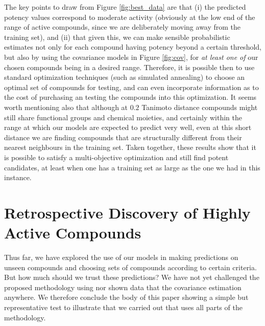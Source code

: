 \documentclass[journal=jacsat,manuscript=article]{achemso}
\begin{document}
\newline
\newline
The key points to draw from Figure \ref{fig:best_data} are that (i) the predicted potency values correspond to moderate activity (obviously at the low end of the range of active compounds, since we are deliberately moving away from the training set), and (ii) that given this, we can make sensible probabilistic estimates not only for each compound having potency beyond a certain threshold, but also by using the covariance models in Figure \ref{fig:cov}, for \textit{at least one of} our chosen compounds being in a desired range.   
Therefore, it is possible then to use standard optimization techniques (such as simulated annealing) to choose an optimal set of compounds for testing, and can even incorporate information as to the cost of purchasing an testing the compounds into this optimization. It seems worth mentioning also that although at $0.2$ Tanimoto distance compounds might still share functional groups and chemical moieties, and certainly within the range at which our models are expected to predict very well, even at this short distance we are finding compounds that are structurally different from their nearest neighbours in the training set.  
Taken together,  these results show that it is possible to satisfy a multi-objective optimization and still find  potent candidates, at least when one has a training set as large as the one we had in this instance.

\section*{Retrospective Discovery of Highly Active Compounds}

Thus far, we have explored the use of our models in making predictions on unseen compounds and choosing sets of compounds according to certain criteria.  But how much should we trust these predictions?  We have not yet challenged the proposed methodology using 
nor shown data that the covariance estimation anywhere.  We therefore conclude the body of this paper showing a simple but representative test to illustrate 
that we carried out that uses all parts of the methodology.
\end{document}
